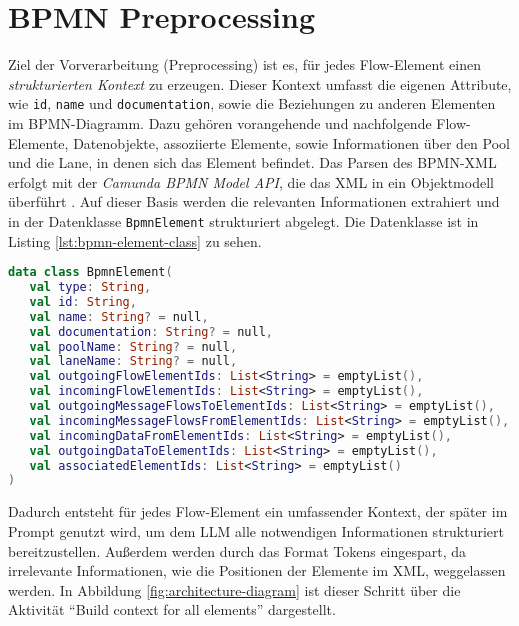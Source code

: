 \section{BPMN Preprocessing}\label{sec:bpmn-preprocessing}

Ziel der Vorverarbeitung (Preprocessing) ist es, für jedes Flow-Element einen \emph{strukturierten Kontext} zu erzeugen. Dieser Kontext umfasst die eigenen Attribute, wie \texttt{id}, \texttt{name} und \texttt{documentation}, sowie die Beziehungen zu anderen Elementen im \ac{BPMN}-Diagramm. Dazu gehören vorangehende und nachfolgende Flow-Elemente, Datenobjekte, assoziierte Elemente, sowie Informationen über den Pool und die Lane, in denen sich das Element befindet. Das Parsen des \ac{BPMN}-XML erfolgt mit der \emph{Camunda BPMN Model API}, die das XML in ein Objektmodell überführt \cite{camunda-bpmn-model-api, camunda-bpmn-model-read}. Auf dieser Basis werden die relevanten Informationen extrahiert und in der Datenklasse \texttt{BpmnElement} strukturiert abgelegt. Die Datenklasse ist in Listing \ref{lst:bpmn-element-class} zu sehen.

\begin{lstlisting}[language=Kotlin,caption={Interne \ac{BPMN}-Repräsentation je Flow-Element.},label={lst:bpmn-element-class}]
data class BpmnElement(
   val type: String,
   val id: String,
   val name: String? = null,
   val documentation: String? = null,
   val poolName: String? = null,
   val laneName: String? = null,
   val outgoingFlowElementIds: List<String> = emptyList(),
   val incomingFlowElementIds: List<String> = emptyList(),
   val outgoingMessageFlowsToElementIds: List<String> = emptyList(),
   val incomingMessageFlowsFromElementIds: List<String> = emptyList(),
   val incomingDataFromElementIds: List<String> = emptyList(),
   val outgoingDataToElementIds: List<String> = emptyList(),
   val associatedElementIds: List<String> = emptyList()
)
\end{lstlisting}

\newpage
Dadurch entsteht für jedes Flow-Element ein umfassender Kontext, der später im Prompt genutzt wird, um dem \ac{LLM} alle notwendigen Informationen strukturiert bereitzustellen. Außerdem werden durch das Format Tokens eingespart, da irrelevante Informationen, wie die Positionen der Elemente im XML, weggelassen werden. In Abbildung \ref{fig:architecture-diagram} ist dieser Schritt über die Aktivität \enquote{Build context for all elements} dargestellt.